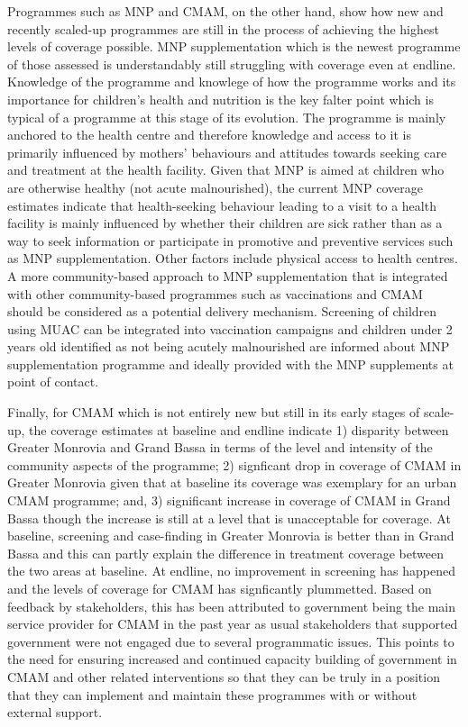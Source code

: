 \documentclass[12pt,a4paper]{article}
\begin{document}
Programmes such as MNP and CMAM, on the other hand, show how new and recently scaled-up programmes are still in the process of achieving the highest levels of coverage possible. MNP supplementation which is the newest programme of those assessed is understandably still struggling with coverage even at endline. Knowledge of the programme and knowlege of how the programme works and its importance for children's health and nutrition is the key falter point which is typical of a programme at this stage of its evolution. The programme is mainly anchored to the health centre and therefore knowledge and access to it is primarily influenced by mothers' behaviours and attitudes towards seeking care and treatment at the health facility. Given that MNP is aimed at children who are otherwise healthy (not acute malnourished), the current MNP coverage estimates indicate that health-seeking behaviour leading to a visit to a health facility is mainly influenced by whether their children are sick rather than as a way to seek information or participate in promotive and preventive services such as MNP supplementation. Other factors include physical access to health centres. A more community-based approach to MNP supplementation that is integrated with other community-based programmes such as vaccinations and CMAM should be considered as a potential delivery mechanism. Screening of children using MUAC can be integrated into vaccination campaigns and children under 2 years old identified as not being acutely malnourished are informed about MNP supplementation programme and ideally provided with the MNP supplements at point of contact.

Finally, for CMAM which is not entirely new but still in its early stages of scale-up, the coverage estimates at baseline and endline indicate 1) disparity between Greater Monrovia and Grand Bassa in terms of the level and intensity of the community aspects of the programme; 2) signficant drop in coverage of CMAM in Greater Monrovia given that at baseline its coverage was exemplary for an urban CMAM programme; and, 3) significant increase in coverage of CMAM in Grand Bassa though the increase is still at a level that is unacceptable for coverage. At baseline, screening and case-finding in Greater Monrovia is better than in Grand Bassa and this can partly explain the difference in treatment coverage between the two areas at baseline. At endline, no improvement in screening has happened and the levels of coverage for CMAM has signficantly plummetted. Based on feedback by stakeholders, this has been attributed to government being the main service provider for CMAM in the past year as usual stakeholders that supported government were not engaged due to several programmatic issues. This points to the need for ensuring increased and continued capacity building of government in CMAM and other related interventions so that they can be truly in a position that they can implement and maintain these programmes with or without external support.
\end{document}
